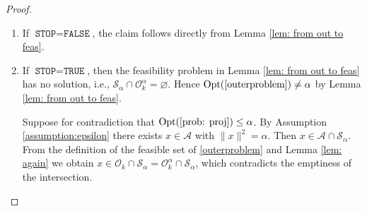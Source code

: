 \documentclass[12pt]{amsart}
\theoremstyle{plain}
\theoremstyle{definition}
\begin{document}
\begin{proof}
\begin{enumerate}
    \item If \(\texttt{STOP} = \texttt{FALSE}\), the claim follows directly from Lemma \ref{lem: from out to feas}.
    \item If \(\texttt{STOP} = \texttt{TRUE}\), then the feasibility problem in Lemma \ref{lem: from out to feas} has no solution, i.e., \(\mathcal{S}_\alpha \cap \mathcal{O}_k^\alpha = \varnothing\). Hence \(\operatorname{Opt}(\eqref{outerproblem}) \neq \alpha\) by Lemma \ref{lem: from out to feas}.

    Suppose for contradiction that \(\operatorname{Opt}(\eqref{prob: proj}) \le \alpha\). By Assumption \ref{assumption:epsilon} there exists \(x \in \mathcal{A}\) with \(\|x\|^2 = \alpha\). Then \(x \in \mathcal{A} \cap \mathcal{S}_\alpha\). From the definition of the feasible set of \eqref{outerproblem} and Lemma \ref{lem: again} we obtain \(x \in \mathcal{O}_k \cap \mathcal{S}_\alpha = \mathcal{O}_k^\alpha \cap \mathcal{S}_\alpha\), which contradicts the emptiness of the intersection. 
\end{enumerate}
\end{proof}
\end{document}
